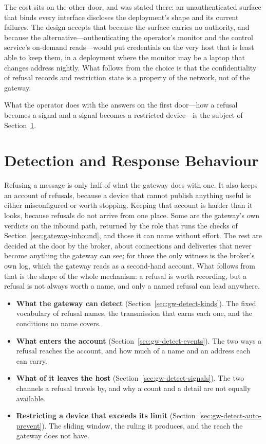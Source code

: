\documentclass[12pt,a4paper]{report}
\begin{document}
The cost sits on the other door, and was stated there: an unauthenticated
surface that binds every interface discloses the deployment's shape and
its current failures. The design accepts that because the surface
carries no authority, and because the alternative---authenticating the
operator's monitor and the control service's on-demand reads---would
put credentials on the very host that is least able to keep them, in a
deployment where the monitor may be a laptop that changes address
nightly. What follows from the choice is that the confidentiality of
refusal records and restriction state is a property of the network, not
of the gateway.

What the operator does with the answers on the first door---how a
refusal becomes a signal and a signal becomes a restricted
device---is the subject of Section~\ref{sec:gateway-detection}.


\section{Detection and Response Behaviour}
\label{sec:gateway-detection}

Refusing a message is only half of what the gateway does with one. It
also keeps an account of refusals, because a device that cannot publish
anything useful is either misconfigured or worth stopping. Keeping that
account is harder than it looks, because refusals do not arrive from
one place. Some are the gateway's own verdicts on the inbound path,
returned by the role that runs the checks of
Section~\ref{sec:gateway-inbound}, and those it can name without
effort. The rest are decided at the door by the broker, about
connections and deliveries that never become anything the gateway can
see; for those the only witness is the broker's own log, which the
gateway reads as a second-hand account. What follows from that is the
shape of the whole mechanism: a refusal is worth recording, but a
refusal is not always worth a name, and only a named refusal can lead
anywhere.

\begin{itemize}
    \item \textbf{What the gateway can detect}
    (Section~\ref{sec:gw-detect-kinds}).
    The fixed vocabulary of refusal names, the transmission that earns
    each one, and the conditions no name covers.
    \item \textbf{What enters the account}
    (Section~\ref{sec:gw-detect-events}).
    The two ways a refusal reaches the account, and how much of a name
    and an address each can carry.
    \item \textbf{What of it leaves the host}
    (Section~\ref{sec:gw-detect-signals}).
    The two channels a refusal travels by, and why a count and a
    detail are not equally available.
    \item \textbf{Restricting a device that exceeds its limit}
    (Section~\ref{sec:gw-detect-auto-prevent}).
    The sliding window, the ruling it produces, and the reach the
    gateway does not have.
\end{itemize}
\end{document}
